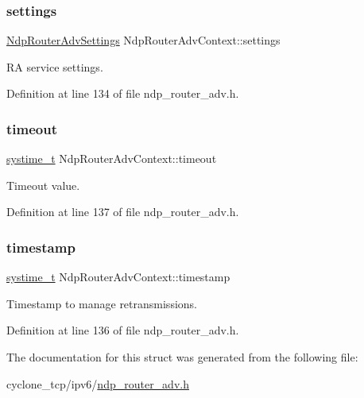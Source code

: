 \mbox{\label{structNdpRouterAdvContext_ac0f413b02fb1832bc4fb85c133784033}} 
\subsubsection{\texorpdfstring{settings}{settings}}
{\footnotesize\ttfamily \hyperlink{structNdpRouterAdvSettings}{Ndp\+Router\+Adv\+Settings} Ndp\+Router\+Adv\+Context\+::settings}



RA service settings. 



Definition at line 134 of file ndp\+\_\+router\+\_\+adv.\+h.

\mbox{\label{structNdpRouterAdvContext_a7df6bf4f325f1f942f9d312d0b08ee39}} 
\subsubsection{\texorpdfstring{timeout}{timeout}}
{\footnotesize\ttfamily \hyperlink{compiler__port_8h_ae3e32a98d431a02106616da3071832dd}{systime\+\_\+t} Ndp\+Router\+Adv\+Context\+::timeout}



Timeout value. 



Definition at line 137 of file ndp\+\_\+router\+\_\+adv.\+h.

\mbox{\label{structNdpRouterAdvContext_a04f8a4915f483d48dcc52bdadf0785c2}} 
\subsubsection{\texorpdfstring{timestamp}{timestamp}}
{\footnotesize\ttfamily \hyperlink{compiler__port_8h_ae3e32a98d431a02106616da3071832dd}{systime\+\_\+t} Ndp\+Router\+Adv\+Context\+::timestamp}



Timestamp to manage retransmissions. 



Definition at line 136 of file ndp\+\_\+router\+\_\+adv.\+h.



The documentation for this struct was generated from the following file\+:\begin{DoxyCompactItemize}
\item 
cyclone\+\_\+tcp/ipv6/\hyperlink{ndp__router__adv_8h}{ndp\+\_\+router\+\_\+adv.\+h}\end{DoxyCompactItemize}
